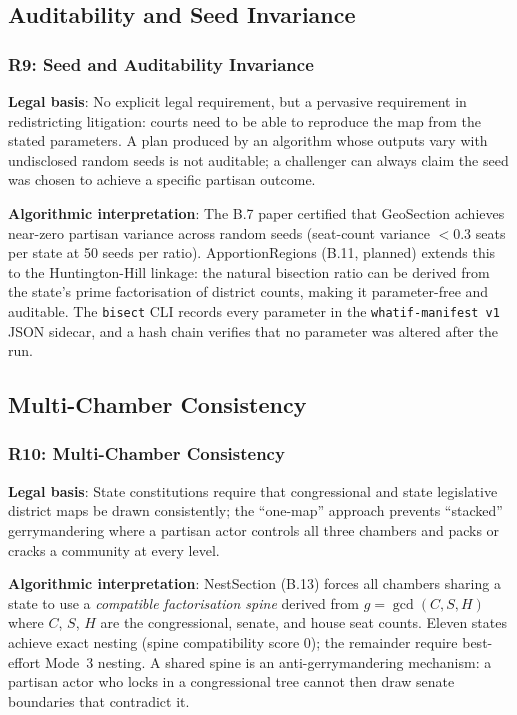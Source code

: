 \subsection{Auditability and Seed Invariance}

\subsubsection*{R9: Seed and Auditability Invariance}

\textbf{Legal basis}: No explicit legal requirement, but a pervasive requirement
in redistricting litigation: courts need to be able to reproduce the map from
the stated parameters.
A plan produced by an algorithm whose outputs vary with undisclosed random seeds
is not auditable; a challenger can always claim the seed was chosen to achieve
a specific partisan outcome.

\textbf{Algorithmic interpretation}: The B.7 paper certified that GeoSection
achieves near-zero partisan variance across random seeds (seat-count variance
$< 0.3$ seats per state at 50 seeds per ratio).
ApportionRegions (B.11, planned) extends this to the Huntington-Hill linkage:
the natural bisection ratio can be derived from the state's prime factorisation
of district counts, making it parameter-free and auditable.
The \texttt{bisect} CLI records every parameter in the \texttt{whatif-manifest v1}
JSON sidecar, and a hash chain verifies that no parameter was altered after
the run.

\subsection{Multi-Chamber Consistency}

\subsubsection*{R10: Multi-Chamber Consistency}

\textbf{Legal basis}: State constitutions require that congressional and state
legislative district maps be drawn consistently; the ``one-map'' approach prevents
``stacked'' gerrymandering where a partisan actor controls all three chambers and
packs or cracks a community at every level.

\textbf{Algorithmic interpretation}: NestSection (B.13) forces all chambers
sharing a state to use a \emph{compatible factorisation spine} derived from
$g = \gcd(C, S, H)$ where $C$, $S$, $H$ are the congressional, senate, and
house seat counts.
Eleven states achieve exact nesting (spine compatibility score 0); the remainder
require best-effort Mode~3 nesting.
A shared spine is an anti-gerrymandering mechanism: a partisan actor who locks
in a congressional tree cannot then draw senate boundaries that contradict it.

